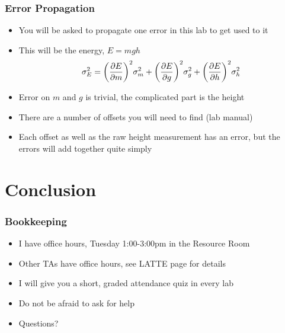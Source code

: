 \documentclass[aspectratio=169]{beamer}
\begin{document}
\begin{frame}
  \frametitle{Error Propagation}
  \begin{itemize}
  \item You will be asked to propagate one error in this lab to get used to it
  \item This will be the energy, $E=mgh$
    \begin{align*}
      \sigma_E^2=\qty(\pdv{E}{m})^2\sigma_m^2+
      \qty(\pdv{E}{g})^2\sigma_g^2+
      \qty(\pdv{E}{h})^2\sigma_h^2
    \end{align*}
  \item Error on $m$ and $g$ is trivial, the complicated part is the height
  \item There are a number of offsets you will need to find (lab manual)
  \item Each offset as well as the raw height measurement has an error, but the errors will add together quite simply
  \end{itemize}
\end{frame}

\section{Conclusion}
\begin{frame}
  \frametitle{Bookkeeping}
  \begin{itemize}
  \item I have office hours, Tuesday 1:00-3:00pm in the Resource Room
  \item Other TAs have office hours, see LATTE page for details
  \item I will give you a short, graded attendance quiz in every lab
  \item Do not be afraid to ask for help
  \item Questions?
  \end{itemize}
\end{frame}
\end{document}
